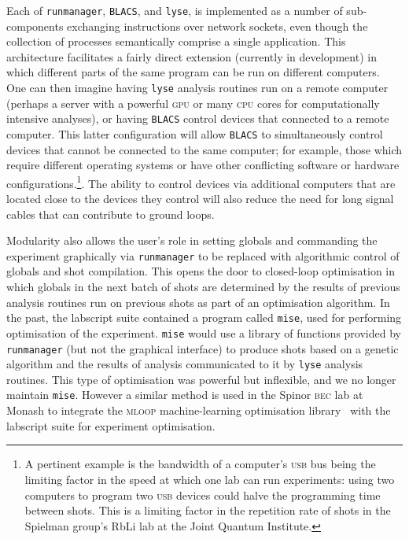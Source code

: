 Each of \texttt{runmanager}, \texttt{BLACS}, and \texttt{lyse}, is implemented as a number of sub-components exchanging instructions over network sockets, even though the collection of processes semantically comprise a single application. This architecture facilitates a fairly direct extension (currently in development) in which different parts of the same program can be run on different computers. One can then imagine having \texttt{lyse} analysis routines run on a remote computer (perhaps a server with a powerful \textsc{gpu} or many \textsc{cpu} cores for computationally intensive analyses), or having \texttt{BLACS} control devices that connected to a remote computer. This latter configuration will allow \texttt{BLACS} to simultaneously control devices that cannot be connected to the same computer; for example, those which require different operating systems or have other conflicting software or hardware configurations.\footnote{A pertinent example is the bandwidth of a computer's \textsc{usb} bus being the limiting factor in the speed at which one lab can run experiments: using two computers to program two \textsc{usb} devices could halve the programming time between shots. This is a limiting factor in the repetition rate of shots in the Spielman group's RbLi lab at the Joint Quantum Institute.}. The ability to control devices via additional computers that are located close to the devices they control will also reduce the need for long signal cables that can contribute to ground loops.

Modularity also allows the user's role in setting globals and commanding the experiment graphically via \texttt{runmanager} to be replaced with algorithmic control of globals and shot compilation. This opens the door to closed-loop optimisation in which globals in the next batch of shots are determined by the results of previous analysis routines run on previous shots as part of an optimisation algorithm. In the past, the labscript suite contained a program called \texttt{mise}, used for performing optimisation of the experiment. \texttt{mise} would use a library of functions provided by \texttt{runmanager} (but not the graphical interface) to produce shots based on a genetic algorithm and the results of analysis communicated to it by \texttt{lyse} analysis routines. This type of optimisation was powerful but inflexible, and we no longer maintain \texttt{mise}. However a similar method is used in the Spinor \textsc{bec} lab at Monash to integrate the \textsc{mloop} machine-learning optimisation library~\cite{wigley_fast_2016} with the labscript suite for experiment optimisation.

